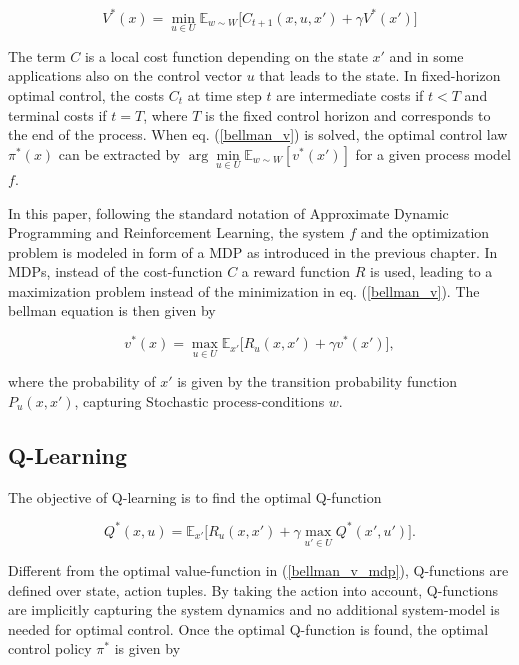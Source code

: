 \begin{equation} 
\label{bellman_v}
V^*(x)=\min\limits_{u\in U}\mathbb{E}_{w\sim W}\Big[C_{t+1}(x, u, x')+ \gamma V^*(x')\Big]
\end{equation}

The term $C$ is a local cost function depending on the state $x'$ and in some applications also on the control vector $u$ that leads to the state. In fixed-horizon optimal control, the costs $C_{t}$ at time step $t$ are intermediate costs if $t<T$ and terminal costs if $t=T$, where $T$ is the fixed control horizon and corresponds to the end of the process. When eq. (\ref{bellman_v}) is solved, the optimal control law $\pi^*(x)$ can be extracted by $\arg\min\limits_{u\in U}\mathbb{E}_{w\sim W}[v^*(x')]$ for a given process model $f$.

In this paper, following the standard notation of Approximate Dynamic Programming and Reinforcement Learning, the system $f$ and the optimization problem is modeled in form of a MDP as introduced in the previous chapter. In MDPs, instead of the cost-function $C$ a reward function $R$ is used, leading to a maximization problem instead of the minimization in eq. (\ref{bellman_v}). The bellman equation is then given by

\begin{equation}
\label{bellman_v_mdp}
v^*(x)=\max\limits_{u\in U}\mathbb{E}_{x'}\Big[R_u(x, x')+ \gamma v^*(x')\Big],
\end{equation}

where the probability of $x'$ is given by the transition probability function $P_u(x, x')$, capturing Stochastic process-conditions $w$.

\subsection{Q-Learning}
\label{qLearning}

The objective of Q-learning \cite{watkins1989} is to find the optimal Q-function

\begin{equation}
\label{optimal_q}
Q^*(x, u)=\mathbb{E}_{x'}\Big[R_u(x, x')+\gamma \max\limits_{u'\in U}Q^*(x',u')\Big].
\end{equation}

Different from the optimal value-function in (\ref{bellman_v_mdp}), Q-functions are defined over state, action tuples. By taking the action into account, Q-functions are implicitly capturing the system dynamics and no additional system-model is needed for optimal control. Once the optimal Q-function is found, the optimal control policy $\pi^*$ is given by

